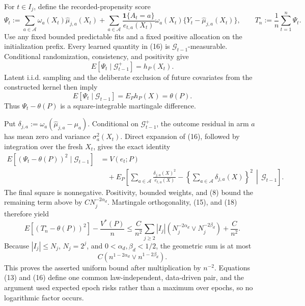For \(t\in I_j\), define the recorded-propensity score
\[
\Psi_t:=
\sum_{a\in\mathcal A}\omega_a(X_t)\widehat\mu_{j,a}(X_t)
+\sum_{a\in\mathcal A}
\frac{\mathbf 1\{A_t=a\}}{e_{t,a}(X_t)}
\omega_a(X_t)\{Y_t-\widehat\mu_{j,a}(X_t)\},
\qquad
T_n^{\circ}:=\frac1n\sum_{t=1}^n\Psi_t.
\tag{16}
\]
Use any fixed bounded predictable fits and a fixed positive allocation on the initialization prefix.  Every learned quantity in (16) is \(\mathcal G_{t-1}\)-measurable.  Conditional randomization, consistency, and positivity give
\[
E[\Psi_t\mid\mathcal G_{t-1}^{+}]=h_P(X_t).
\]
Latent i.i.d. sampling and the deliberate exclusion of future covariates from the constructed kernel then imply
\[
E[\Psi_t\mid\mathcal G_{t-1}]=E_Ph_P(X)=\theta(P).
\tag{17}
\]
Thus \(\Psi_t-\theta(P)\) is a square-integrable martingale difference.

Put \(\delta_{j,a}:=\omega_a(\widehat\mu_{j,a}-\mu_a)\).  Conditional on \(\mathcal G_{t-1}^{+}\), the outcome residual in arm \(a\) has mean zero and variance \(\sigma_a^2(X_t)\).  Direct expansion of (16), followed by integration over the fresh \(X_t\), gives the exact identity
\[
\begin{aligned}
E[(\Psi_t-\theta(P))^2\mid\mathcal G_{t-1}]
&=V(e_t;P)\\
&\quad+E_P\!\left[
\sum_{a\in\mathcal A}\frac{\delta_{j,a}(X)^2}{e_{t,a}(X)}
-\left\{\sum_{a\in\mathcal A}\delta_{j,a}(X)\right\}^2
\,\middle|\,\mathcal G_{t-1}\right].
\end{aligned}
\tag{18}
\]
The final square is nonnegative.  Positivity, bounded weights, and (8) bound the remaining term above by \(CN_j^{-2\alpha_d}\).  Martingale orthogonality, (15), and (18) therefore yield
\[
E[(T_n^{\circ}-\theta(P))^2]-\frac{V^*(P)}n
\leq\frac{C}{n^2}\sum_{j\geq2}|I_j|
\left(N_j^{-2\alpha_d}\vee N_j^{-2\beta_d}\right)
+\frac{C}{n^2}.
\]
Because \(|I_j|\leq N_j\), \(N_j=2^j\), and \(0<\alpha_d,\beta_d<1/2\), the geometric sum is at most
\[
C\left(n^{1-2\alpha_d}\vee n^{1-2\beta_d}\right).
\]
This proves the asserted uniform bound after multiplication by \(n^{-2}\).  Equations (13) and (16) define one common law-independent, data-driven pair, and the argument used expected epoch risks rather than a maximum over epochs, so no logarithmic factor occurs.